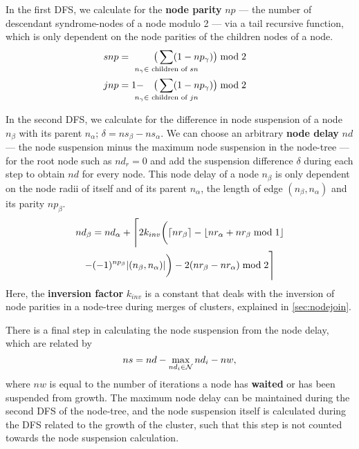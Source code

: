 In the first DFS, we calculate for the \textbf{node parity} $np$ --- the number of descendant syndrome-nodes of a node modulo 2 --- via a tail recursive function, which is only dependent on the node parities of the children nodes of a node.
\begin{align}\label{eq:nodeparity}
    snp &= &\big( \sum_{\mathclap{n_\gamma \in \text{ children of } sn}} (1-np_\gamma) \big ) \bmod 2 \hspace{1em}  \\
    jnp &= 1 - &\big(\sum_{\mathclap{n_\gamma \in \text{ children of } jn}} (1-np_\gamma) \big) \bmod 2 \hspace{1em}
\end{align}

In the second DFS, we calculate for the difference in node suspension of a node $n_\beta$ with its parent $n_\alpha$; $\delta = ns_\beta - ns_\alpha$. We can choose an arbitrary \textbf{node delay} $nd$ --- the node suspension minus the maximum node suspension in the node-tree --- for the root node such as $nd_r=0$ and add the suspension difference $\delta$ during each step to obtain $nd$ for every node. This node delay of a node $n_\beta$ is only dependent on the node radii of itself and of its parent $n_\alpha$, the length of edge $(n_\beta, n_\alpha)$ and its parity $np_\beta$. 
\begin{multline}\label{eq:delayequation}
    nd_\beta = nd_\alpha + \Bigg \lceil 2k_{inv}\bigg(\ceil{nr_\beta} - \floor{nr_\alpha + nr_\beta \bmod 1}\\
    - (-1)^{np_\beta}\abs{(n_\beta,n_\alpha)}\bigg) - 2(nr_\beta - nr_\alpha) \bmod2 \Bigg \rceil
\end{multline}
Here, the \textbf{inversion factor} $k_{inv}$ is a constant that deals with the inversion of node parities in a node-tree during merges of clusters, explained in \ref{sec:nodejoin}. 

There is a final step in calculating the node suspension from the node delay, which are related by
\begin{equation}\label{eq:suspension}
    ns = nd - \max_{nd_i \in \nset} nd_i - nw, 
\end{equation}
where $nw$ is equal to the number of iterations a node has \textbf{waited} or has been suspended from growth. The maximum node delay can be maintained during the second DFS of the node-tree, and the node suspension itself is calculated during the DFS related to the growth of the cluster, such that this step is not counted towards the node suspension calculation. 

